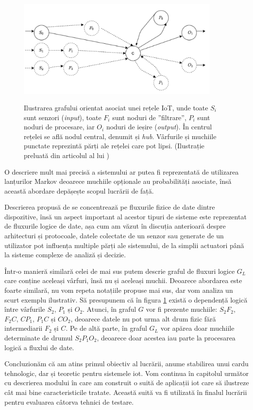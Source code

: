 \begin{figure}[h]
    \centering
    \caption{\centering Ilustrarea grafului orientat asociat unei rețele IoT, unde toate $S_i$ sunt senzori (\textit{input}), toate $F_i$ sunt noduri de ”filtrare”, $P_i$ sunt noduri de procesare, iar $O_i$ noduri de ieșire (\textit{output}). În centrul rețelei se află nodul central, denumit și \textit{hub}. Vârfurile și muchiile punctate reprezintă părți ale rețelei care pot lipsi. \newline (Ilustrație preluată din articolul  al lui \citet{Paduraru2021})}
    \includegraphics[width=0.9\textwidth]{images/river_topologie.png}
    \label{fig:river_network}
\end{figure}

O descriere mult mai precisă a sistemului ar putea fi reprezentată de utilizarea lanțurilor Markov deoarece muchiile opționale au probabilități asociate, însă această abordare depășește scopul lucrării de față.

Descrierea propusă de \citet{Paduraru2021} se concentrează pe fluxurile fizice de date dintre dispozitive, însă un aspect important al acestor tipuri de sisteme este reprezentat de fluxurile logice de date, așa cum am văzut în discuția anterioară despre arhitecturi și protocoale, datele colectate de un senzor sau generate de un utilizator pot influența multiple părți ale sistemului, de la simplii actuatori până la sisteme complexe de analiză și decizie.

Într-o manieră similară celei de mai sus putem descrie graful de fluxuri logice $G_L$ care conține aceleași vârfuri, însă nu și aceleași muchii. Deoarece abordarea este foarte similară, nu vom repeta notațiile propuse mai sus, dar vom analiza un scurt exemplu ilustrativ. Să presupunem că în figura \ref{fig:river_network} există o dependență logică între vârfurile $S_2$, $P_1$ și $O_2$. Atunci, în graful $G$ vor fi prezente muchiile: $S_2 F_2$, $F_2 C$, $C P_1$, $P_1 C$ și $C O_2$, deoarece datele nu pot urma alt drum fizic fără intermediarii $F_2$ și $C$. Pe de altă parte, în graful $G_L$ vor apărea doar muchiile determinate de drumul $S_2 P_1 O_2$, deoarece doar acestea iau parte la procesarea logică a fluxlui de date.

Concluzionăm că am atins primul obiectiv al lucrării, anume stabilirea unui cardu tehnologic, dar și teoretic pentru sistemele \acrshort{iot}. Vom continua în capitolul următor cu descrierea modului în care am construit o suită de aplicații \acrshort{iot} care să ilustreze cât mai bine caracteristicile tratate. Această suită va fi utilizată în finalul lucrării pentru evaluarea câtorva tehnici de testare.